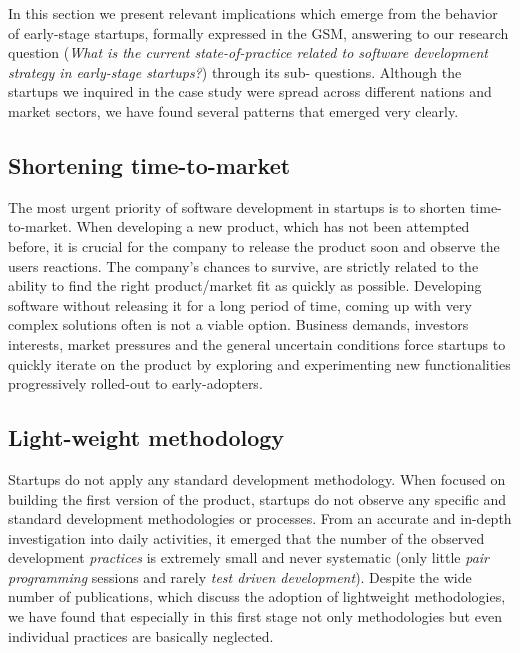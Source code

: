 \documentclass[10pt,journal,letterpaper,compsoc]{IEEEtran}
\begin{document}
In this section we present relevant implications which emerge from the behavior
of early-stage startups, formally expressed in the GSM, answering to our
research question (\textit{What is the current state-of-practice related to
software development strategy in early-stage startups?}) through its sub-
questions. Although the startups we inquired in the case study were spread
across different nations and market sectors, we have found several patterns
that emerged very clearly.

\subsection{Shortening time-to-market}

The most urgent priority of software development in startups is to shorten
time-to-market. When developing a new product, which has not been attempted
before, it is crucial for the company to release the product soon and observe
the users reactions. The company's chances to survive, are strictly related to
the ability to find the right product/market fit as quickly as possible.
Developing software without releasing it for a long period of time, coming up
with very complex solutions often is not a viable option. Business demands,
investors interests, market pressures and the general uncertain conditions force
startups to quickly iterate on the product by exploring and experimenting new
functionalities progressively rolled-out to early-adopters. 



\subsection{Light-weight methodology} 
Startups do not apply any standard development methodology. When focused on 
building the first version of the product, startups do not observe any 
specific and standard development methodologies or processes. From an accurate 
and in-depth investigation into daily activities, it emerged that the number of 
the observed development \textit{practices} is extremely small and never 
systematic (only little \textit{pair programming} sessions and rarely 
\textit{test driven development}). Despite the wide number of publications, 
which discuss the adoption of lightweight methodologies, we have found that 
especially in this first stage not only methodologies but even individual 
practices are basically neglected.
\end{document}
